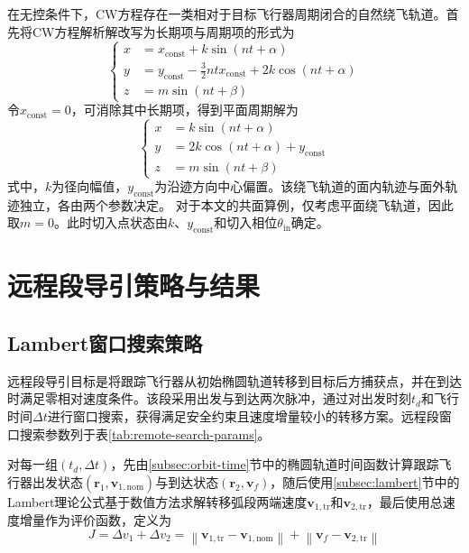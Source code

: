 \documentclass[10.5pt,twocolumn]{aaas}
\begin{document}
在无控条件下，CW方程存在一类相对于目标飞行器周期闭合的自然绕飞轨道。首先将CW方程解析解改写为长期项与周期项的形式为
\begin{equation}
  \left\{
  \begin{aligned}
    x & =x_{\mathrm{const}}+k\sin (nt+\alpha)                                   \\
    y & =y_{\mathrm{const}}-\frac{3}{2}ntx_{\mathrm{const}} +2k\cos (nt+\alpha) \\
    z & =m\sin(nt+\beta)
  \end{aligned}\right.
\end{equation}
令$x_\mathrm{const}=0$，可消除其中长期项，得到平面周期解为
\begin{equation}
  \left\{
  \begin{aligned}
    x & =k\sin(nt+\alpha)                    \\
    y & =2k\cos(nt+\alpha) +y_\mathrm{const} \\
    z & =m\sin(nt+\beta)
  \end{aligned}
  \right.
  \label{eq:fly-around-orbit}
\end{equation}
式中，$k$为径向幅值，$y_\mathrm{const}$为沿迹方向中心偏置。该绕飞轨道的面内轨迹与面外轨迹独立，各由两个参数决定。
对于本文的共面算例，仅考虑平面绕飞轨道，因此取$m=0$。此时切入点状态由$k$、$y_\mathrm{const}$和切入相位$\theta_{\mathrm{in}}$确定。

\section{远程段导引策略与结果}

\subsection{Lambert窗口搜索策略}

远程段导引目标是将跟踪飞行器从初始椭圆轨道转移到目标后方捕获点，并在到达时满足零相对速度条件。该段采用出发与到达两次脉冲，通过对出发时刻$t_d$和飞行时间$\Delta t$进行窗口搜索，获得满足安全约束且速度增量较小的转移方案。远程段窗口搜索参数列于表\ref{tab:remote-search-params}。

对每一组$(t_d,\Delta t)$，先由\ref{subsec:orbit-time}节中的椭圆轨道时间函数计算跟踪飞行器出发状态$(\boldsymbol{r}_1,\boldsymbol{v}_{1,\mathrm{nom}})$与到达状态$(\boldsymbol{r}_2,\boldsymbol{v}_{f})$，随后使用\ref{subsec:lambert}节中的Lambert理论公式基于数值方法求解转移弧段两端速度$\boldsymbol{v}_{1,\mathrm{tr}}$和$\boldsymbol{v}_{2,\mathrm{tr}}$，最后使用总速度增量作为评价函数，定义为
\begin{equation}
  J = \Delta v_1 + \Delta v_2
  =
  \left\|\boldsymbol{v}_{1,\mathrm{tr}}-\boldsymbol{v}_{1,\mathrm{nom}}\right\|
  +
  \left\|\boldsymbol{v}_f-\boldsymbol{v}_{2,\mathrm{tr}}\right\|
\end{equation}
\end{document}
